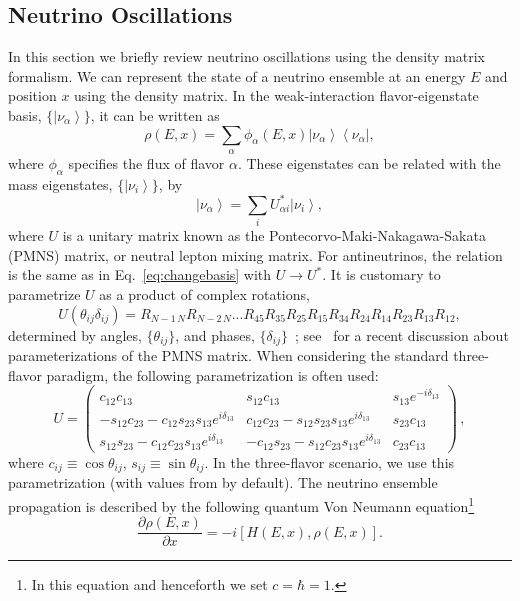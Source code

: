 \documentclass[3p,12pt]{elsarticle}
\newcommand{\bra}[1]{\ensuremath{\left\langle#1\right|}}
\newcommand{\ket}[1]{\ensuremath{\left|#1\right\rangle}}
\newcommand{\pa}[2]{\frac{\partial #1}{\partial #2}}
\begin{document}
\subsection{Neutrino Oscillations}
\label{sec:theory} 
In this section we briefly review neutrino oscillations
using the density matrix formalism.
We can represent the state of a neutrino ensemble at an energy $E$
and position $x$ using the density matrix. In the weak-interaction flavor-eigenstate basis,
$\{\ket{\nu_\alpha}\}$,  it can be written as
\begin{equation}
\rho(E,x) = \sum_\alpha \phi_\alpha(E,x) \ket{\nu_\alpha}\bra{\nu_\alpha} , 
\label{eq:state}
\end{equation}
where $\phi_\alpha$ specifies the flux of flavor $\alpha$.
These eigenstates can be related with the mass eigenstates,  $\{ \ket{\nu_i}  \}$, by
\begin{equation}
\ket{\nu_\alpha} = \sum_i U^*_{\alpha i} \ket{\nu_i} ,
\label{eq:changebasis}
\end{equation}
where $U$ is a unitary matrix known as the Pontecorvo-Maki-Nakagawa-Sakata (PMNS)
matrix, or neutral lepton mixing matrix. For antineutrinos, the relation
is the same as in 
Eq.~\eqref{eq:changebasis} with $U \to U^*$.
It is customary to parametrize $U$ as a product of complex rotations,
\begin{equation}
\label{eq:mixing}
U(\theta_{ij}\delta_{ij})=R_{N-1\, N} R_{N-2\, N} ... R_{45} R_{35} R_{25} R_{15}
R_{34} R_{24} R_{14} R_{23} R_{13} R_{12}, 
\end{equation}
determined by angles, $\{\theta_{ij}\}$, and phases, $\{ \delta_{ij}
\}$~\cite{SQUIDS}; see~\cite{Denton:2020igp} for a recent discussion about parameterizations of the PMNS matrix.
When considering the standard three-flavor paradigm,
the following parametrization is often used:
\begin{equation}
U
=
\begin{pmatrix}
c_{12} c_{13} & s_{12} c_{13} & s_{13} e^{-i\delta_{13}} \\ 
- s_{12} c_{23} - c_{12} s_{23} s_{13} e^{i\delta_{13}} & c_{12} c_{23} - s_{12} s_{23} s_{13} e^{i\delta_{13}} & s_{23} c_{13} \\
s_{12}s_{23} -c_{12}c_{23}s_{13}e^{i\delta_{13}} & - c_{12} s_{23} - s_{12} c_{23} s_{13} e^{i\delta_{13}} & c_{23} c_{13}
\end{pmatrix}
\,,
\label{eq:U}
\end{equation}
where $c_{ij} \equiv \cos \theta_{ij}$, $s_{ij} \equiv \sin \theta_{ij}$. In the
three-flavor scenario, we use this parametrization (with
values from \citep{Esteban:2020cvm} by default).
The neutrino ensemble propagation is
described by the following quantum Von Neumann equation\footnote{In this equation and henceforth we set $c = \hbar = 1$.} 
\begin{equation}
\pa{\rho(E,x)}{x} = -i [ H (E,x), \rho(E,x) ].
\label{eq:schrodinger}
\end{equation}
\end{document}
